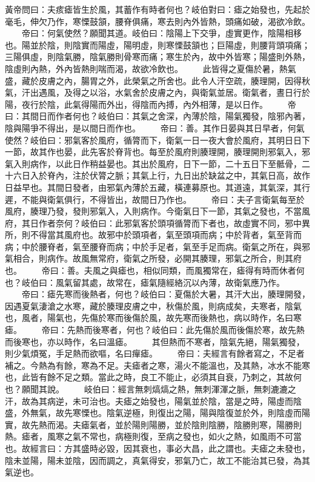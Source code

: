 黃帝問曰：夫痎瘧皆生於風，其蓄作有時者何也？岐伯對曰：瘧之始發也，先起於毫毛，伸欠乃作，寒慄鼓頷，腰脊俱痛，寒去則內外皆熱，頭痛如破，渴欲冷飲。
　　帝曰：何氣使然？願聞其道。岐伯曰：陰陽上下交爭，虛實更作，陰陽相移也。陽並於陰，則陰實而陽虛，陽明虛，則寒慄鼓頷也；巨陽虛，則腰背頭項痛；三陽俱虛，則陰氣勝，陰氣勝則骨寒而痛；寒生於內，故中外皆寒；陽盛則外熱，陰虛則內熱，外內皆熱則喘而渴，故欲冷飲也。
　　此皆得之夏傷於暑，熱氣盛，藏於皮膚之內，腸胃之外，此榮氣之所舍也。此令人汗空疏，腠理開，因得秋氣，汗出遇風，及得之以浴，水氣舍於皮膚之內，與衛氣並居。衛氣者，晝日行於陽，夜行於陰，此氣得陽而外出，得陰而內搏，內外相薄，是以日作。
　　帝曰：其間日而作者何也？岐伯曰：其氣之舍深，內薄於陰，陽氣獨發，陰邪內著，陰與陽爭不得出，是以間日而作也。
　　帝曰：善。其作日晏與其日早者，何氣使然？岐伯曰：邪氣客於風府，循膂而下，衛氣一日一夜大會於風府，其明日日下一節，故其作也晏，此先客於脊背也。每至於風府則腠理開，腠理開則邪氣入，邪氣入則病作，以此日作稍益晏也。其出於風府，日下一節，二十五日下至骶骨，二十六日入於脊內，注於伏膂之脈；其氣上行，九日出於缺盆之中，其氣日高，故作日益早也。其間日發者，由邪氣內薄於五藏，橫連募原也。其道遠，其氣深，其行遲，不能與衛氣俱行，不得皆出，故間日乃作也。
　　帝曰：夫子言衛氣每至於風府，腠理乃發，發則邪氣入，入則病作。今衛氣日下一節，其氣之發也，不當風府，其日作者奈何？岐伯曰：此邪氣客於頭項循膂而下者也，故虛實不同，邪中異所，則不得當其風府也。故邪中於頭項者，氣至頭項而病；中於背者，氣至背而病；中於腰脊者，氣至腰脊而病；中於手足者，氣至手足而病。衛氣之所在，與邪氣相合，則病作。故風無常府，衛氣之所發，必開其腠理，邪氣之所合，則其府也。
　　帝曰：善。夫風之與瘧也，相似同類，而風獨常在，瘧得有時而休者何也？岐伯曰：風氣留其處，故常在，瘧氣隨經絡沉以內薄，故衛氣應乃作。
　　帝曰：瘧先寒而後熱者，何也？岐伯曰：夏傷於大暑，其汗大出，腠理開發，因遇夏氣淒滄之水寒，藏於腠理皮膚之中，秋傷於風，則病成矣，夫寒者，陰氣也，風者，陽氣也，先傷於寒而後傷於風，故先寒而後熱也，病以時作，名曰寒瘧。
　　帝曰：先熱而後寒者，何也？岐伯曰：此先傷於風而後傷於寒，故先熱而後寒也，亦以時作，名曰溫瘧。
　　其但熱而不寒者，陰氣先絕，陽氣獨發，則少氣煩冤，手足熱而欲嘔，名曰癉瘧。
　　帝曰：夫經言有餘者寫之，不足者補之。今熱為有餘，寒為不足。夫瘧者之寒，湯火不能溫也，及其熱，冰水不能寒也，此皆有餘不足之類。當此之時，良工不能止，必須其自衰，乃刺之，其故何也？願聞其說。
　　岐伯曰：經言無刺熇熇之熱，無刺渾渾之脈，無刺漉漉之汗，故為其病逆，未可治也。夫瘧之始發也，陽氣並於陰，當是之時，陽虛而陰盛，外無氣，故先寒慄也。陰氣逆極，則復出之陽，陽與陰復並於外，則陰虛而陽實，故先熱而渴。夫瘧氣者，並於陽則陽勝，並於陰則陰勝，陰勝則寒，陽勝則熱。瘧者，風寒之氣不常也，病極則復，至病之發也，如火之熱，如風雨不可當也。故經言曰：方其盛時必毀，因其衰也，事必大昌，此之謂也。夫瘧之未發也，陰未並陽，陽未並陰，因而調之，真氣得安，邪氣乃亡，故工不能治其已發，為其氣逆也。
